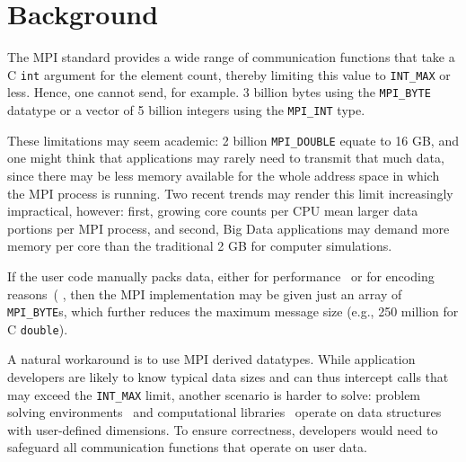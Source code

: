 
\section{Background}

The MPI standard provides a wide range of communication functions that
take a C \texttt{int} argument for the element count, thereby limiting this
value to \texttt{INT\_MAX} or less.
Hence, one cannot send, for example. 3 billion bytes using the \texttt{MPI\_BYTE} 
datatype or a vector of 5 billion integers using the \texttt{MPI\_INT} type. 

These limitations may seem academic: 2 billion
\texttt{MPI\_DOUBLE} equate to 16 GB, and one might think that
applications may rarely need to transmit that much data, since there
may be less memory available for the whole address space in which the MPI
process is running.
Two recent trends may render this limit increasingly impractical, however: 
first, growing core counts per CPU mean larger data portions per MPI 
process, and second, Big Data applications may demand more memory 
per core than the traditional 2 GB for computer simulations.

If the user code manually packs data, either for
performance~\cite{jenkins2012enabling} or for encoding
reasons~(\cite{boostmpi} \cite{li:PnetCDF},
 then the MPI implementation may be given just
an array of \texttt{MPI\_BYTE}s, which further reduces the maximum
message size (e.g., 250 million for C \texttt{double}).

A natural workaround is to use MPI derived datatypes. While 
application developers are likely to know typical data sizes and
can thus intercept calls that may exceed the \texttt{INT\_MAX} limit,
another scenario is harder to solve: problem solving
environments~\cite{cactus:SC01, gromacs} and computational
libraries~\cite{physis, libgeodecomp} operate on data structures with
user-defined dimensions. To ensure correctness, developers would need
to safeguard all communication functions that operate on user data.

%

